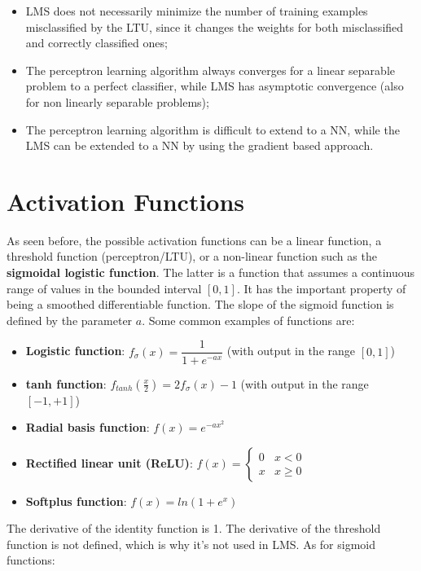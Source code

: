 \begin{itemize}
    \item LMS does not necessarily minimize the number of training examples misclassified by the LTU, since it changes the weights for both misclassified and correctly classified ones;

    \item The perceptron learning algorithm always converges for a linear separable problem to a perfect classifier, while LMS has asymptotic convergence (also for non linearly separable problems);

    \item The perceptron learning algorithm is difficult to extend to a NN, while the LMS can be extended to a NN by using the gradient based approach.
\end{itemize}

\section{Activation Functions}

As seen before, the possible activation functions can be a linear function, a threshold function (perceptron/LTU), or a non-linear function such as the \textbf{sigmoidal logistic function}. The latter is a function that assumes a continuous range of values in the bounded interval $[0,1]$. It has the important property of being a smoothed differentiable function. The slope of the sigmoid function is defined by the parameter $a$. Some common examples of functions are:

\begin{itemize}
    \item \textbf{Logistic function}: $f_{\sigma}(x) = \dfrac{1}{1+e^{-ax}}$ (with output in the range $[0,1]$)

    \item \textbf{tanh function}: $f_{tanh}(\frac{x}{2}) = 2f_{\sigma}(x) - 1$ (with output in the range $[-1,+1]$)

    \item \textbf{Radial basis function}: $f(x) = e^{-ax^2}$

    \item \textbf{Rectified linear unit (ReLU)}:
    $f(x) = \begin{cases}
            0 & x < 0 \\
            x & x \geq 0
            \end{cases}$

    \item \textbf{Softplus function}: $f(x) = ln(1+e^x)$
\end{itemize}
The derivative of the identity function is 1. The derivative of the threshold function is not defined, which is why it's not used in LMS. As for sigmoid functions:

